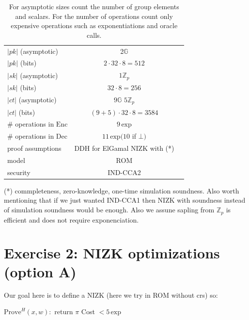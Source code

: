 \documentclass[11pt]{article}
\newcommand{\Enc}{\mathrm{Enc}}
\newcommand{\Dec}{\mathrm{Dec}}
\newcommand{\Prove}{\mathrm{Prove}}
\newcommand{\pk}{pk}
\newcommand{\sk}{sk}
\newcommand{\ct}{\mathit{ct}}
\newcommand{\size}[1]{\left|#1\right|}
\newcommand{\G}{\mathbb{G}}
\newcommand{\Zp}{\mathbb{Z}_p}
\renewcommand{\exp}[1]{#1\,\mathrm{exp}}
\begin{document}
\begin{enumerate}
\begin{table}[H]
\begin{tabular}{l|c|c}
    $\size{\pk}$ (asymptotic)
    & 2$\G$ 
    &  
    \\
    
    $\size{\pk}$ (bits)
    & $2 \cdot 32 \cdot 8=512$ 
    & 
    \\
    
    $\size{\sk}$ (asymptotic)
    & $1\Zp$
    & 
    \\
    
    $\size{\sk}$ (bits)
    & $32 \cdot 8 = 256$ 
    &
    \\
    
    $\size{\ct}$ (asymptotic)
    & $9\G$ $5\Zp$
    & 
    \\
    
    $\size{\ct}$ (bits)
    & $(9+5)\cdot32\cdot8=3584$ 
    &
    \\
    
    \# operations in $\Enc$
    & $\exp {9}$ 
    & 
    \\
    
    \# operations in $\Dec$
    & $\exp {11} (10$ if $\bot)$ 
    & 
    \\
    
    proof assumptions
    & DDH for ElGamal NIZK with (*)  
    &
    \\
    
    model
    & ROM 
    &
    \\
    
    security
    & IND-CCA2 
    & 
  \end{tabular}
  \caption{
    For asymptotic sizes count the number of group elements and scalars.
    For the number of operations count only expensive operations such as exponentiations and oracle calls.
  }
\end{table}
\end{enumerate}

(*) commpleteness, zero-knowledge, one-time simulation soundness. Also worth mentioning that if we just wanted 
IND-CCA1 then NIZK with soundness instead of simulation soundness would be enough.
Also we assune sapling from $\Zp$ is efficient and does not require exponenciation.

\section*{Exercise 2: NIZK optimizations (option A)}
Our goal here is to define a NIZK (here we try in ROM without crs) so:

$\Prove^H(x,w):$ return $\pi$ \hfill Cost $\exp{<5}$
\end{document}

